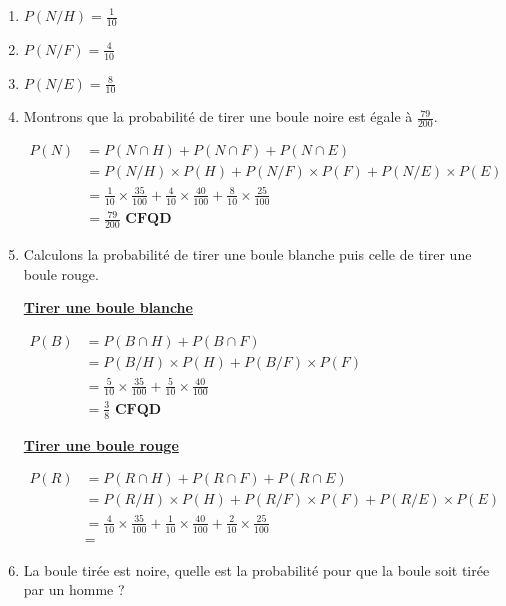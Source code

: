 \documentclass[12pt,a4paper]{article}
\begin{document}
\begin{enumerate}
    \item \( P(N/H) = \frac{1}{10}\)
    \item \( P(N/F) = \frac{4}{10}\)
    \item \( P(N/E) = \frac{8}{10}\)
    \item Montrons que la probabilité de tirer une boule noire est égale à $\frac{79}{200}$.
    
    \( 
			\begin{aligned}
			P(N) &= P(N \cap H) + P(N\cap F) + P(N\cap E)\\
					 &=P(N/H)\times P(H) + P(N/F)\times P(F) + P(N/E)\times P(E)\\
					 &=\frac{1}{10} \times \frac{35}{100} + \frac{4}{10} \times \frac{40}{100} + \frac{8}{10} \times \frac{25}{100}\\
					 &=\frac{79}{200} \textbf{ CFQD}
			\end{aligned}			
    \)
    
    \item Calculons la probabilité de tirer une boule blanche puis celle de tirer une boule rouge.

		\underline{\textbf{Tirer une boule blanche}} 
		
		 \( 
			\begin{aligned}
			P(B) &= P(B \cap H) + P(B\cap F)\\
					 &=P(B/H)\times P(H) + P(B/F)\times P(F)\\
					 &=\frac{5}{10} \times \frac{35}{100} + \frac{5}{10} \times \frac{40}{100}\\
					 &=\frac{3}{8} \textbf{ CFQD}
			\end{aligned}			
    \)
		
		\underline{\textbf{Tirer une boule rouge}}   

	\( 
			\begin{aligned}
			P(R) &= P(R \cap H) + P(R\cap F) + P(R\cap E)\\
					 &=P(R/H)\times P(H) + P(R/F)\times P(F) + P(R/E)\times P(E)\\
					 &=\frac{4}{10} \times \frac{35}{100} + \frac{1}{10} \times \frac{40}{100}+ \frac{2}{10} \times \frac{25}{100}\\
					 &=
			\end{aligned}			
    \)    
    
    \item La boule tirée est noire, quelle est la probabilité pour que la boule soit tirée par un homme ?
\end{enumerate}
\end{document}
